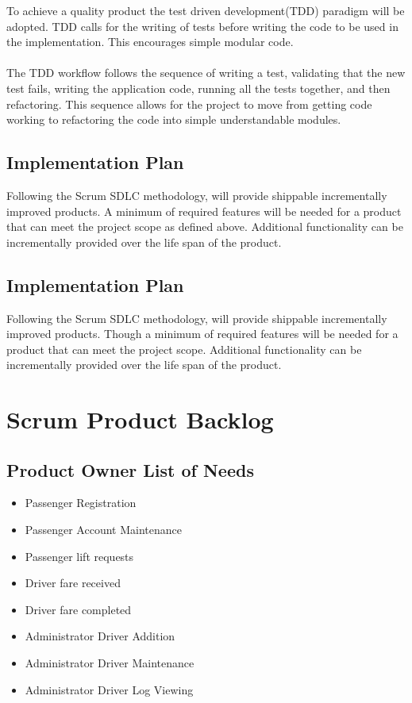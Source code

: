 \documentclass[10pt,twocolumn]{witseiepaper}
\begin{document}
To achieve a quality product the test driven development(TDD) paradigm will be adopted. TDD calls for the writing of tests before writing the code to be used in the implementation. This encourages simple modular code.\\\\
 The TDD workflow follows the sequence of writing a test, validating that the new test fails, writing the application code, running all the tests together, and then refactoring. This sequence allows for the project to move from getting code working to refactoring the code into simple understandable modules.

\subsection{Implementation Plan}

Following the Scrum SDLC methodology, will provide shippable incrementally improved products. A minimum of required features will be needed for a product that can meet the project scope as defined above. Additional functionality can be incrementally provided over the life span of the product.

\subsection{Implementation Plan}

Following the Scrum SDLC methodology, will provide shippable incrementally improved products. Though a minimum of required features will be needed for a product that can meet the project scope. Additional functionality can be incrementally provided over the life span of the product.

\section{Scrum Product Backlog}

\subsection{Product Owner List of Needs}
\begin{itemize}
\item Passenger Registration
\item Passenger Account Maintenance 
\item Passenger lift requests
\item Driver fare received
\item Driver fare completed
\item Administrator Driver Addition
\item Administrator Driver Maintenance 
\item Administrator Driver Log Viewing 
\end{itemize}
\end{document}

